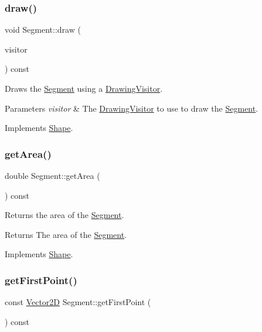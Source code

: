 \subsubsection{\texorpdfstring{draw()}{draw()}}
{\footnotesize\ttfamily void Segment\+::draw (\begin{DoxyParamCaption}\item[{\hyperlink{class_drawing_visitor}{Drawing\+Visitor} $\ast$}]{visitor }\end{DoxyParamCaption}) const\hspace{0.3cm}{\ttfamily [virtual]}}

Draws the \hyperlink{class_segment}{Segment} using a \hyperlink{class_drawing_visitor}{Drawing\+Visitor}. 
\begin{DoxyParams}{Parameters}
{\em visitor} & The \hyperlink{class_drawing_visitor}{Drawing\+Visitor} to use to draw the \hyperlink{class_segment}{Segment}. \\
\hline
\end{DoxyParams}


Implements \hyperlink{class_shape_ae67fc6d39dd33759b65ff6112b21eab7}{Shape}.

\hypertarget{class_segment_af019f332cb32a21a1f9b7ae5acd7b4e7}{}\label{class_segment_af019f332cb32a21a1f9b7ae5acd7b4e7} 
\subsubsection{\texorpdfstring{get\+Area()}{getArea()}}
{\footnotesize\ttfamily double Segment\+::get\+Area (\begin{DoxyParamCaption}{ }\end{DoxyParamCaption}) const\hspace{0.3cm}{\ttfamily [virtual]}}

Returns the area of the \hyperlink{class_segment}{Segment}. \begin{DoxyReturn}{Returns}
The area of the \hyperlink{class_segment}{Segment}. 
\end{DoxyReturn}


Implements \hyperlink{class_shape_ad9454ee04617290547e7529180b1beae}{Shape}.

\hypertarget{class_segment_a6aaa2508c09b60520c402f6e1054be5c}{}\label{class_segment_a6aaa2508c09b60520c402f6e1054be5c} 
\subsubsection{\texorpdfstring{get\+First\+Point()}{getFirstPoint()}}
{\footnotesize\ttfamily const \hyperlink{class_vector2_d}{Vector2D} Segment\+::get\+First\+Point (\begin{DoxyParamCaption}{ }\end{DoxyParamCaption}) const}

